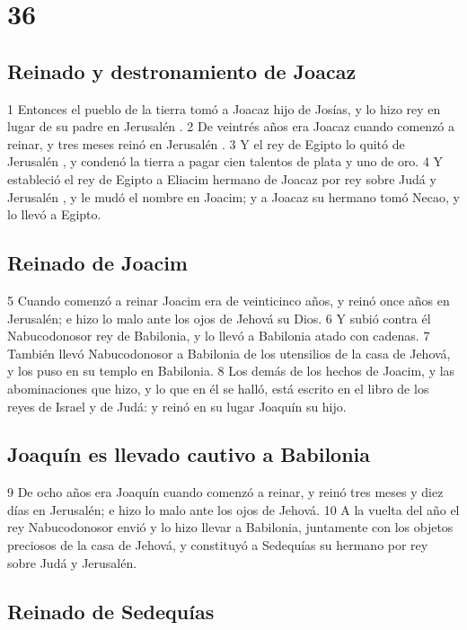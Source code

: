 \chapter{36}

\section*{Reinado y destronamiento de Joacaz}

1 Entonces el pueblo de la tierra tomó a Joacaz hijo de Josías, y lo hizo rey en lugar de su padre en Jerusalén .
2 De veintrés años era Joacaz cuando comenzó a reinar,  y tres meses reinó en Jerusalén .
3 Y el rey de Egipto lo quitó de Jerusalén , y condenó la tierra a pagar cien talentos de plata   y uno de oro.
4 Y estableció el rey de Egipto a Eliacim hermano de Joacaz por rey sobre Judá y Jerusalén , y le mudó el nombre en Joacim; y a Joacaz su hermano tomó Necao, y lo llevó a Egipto. 

\section*{Reinado de Joacim}

5 Cuando comenzó a reinar Joacim era de veinticinco años, y reinó once años en Jerusalén; e hizo lo malo ante los ojos de Jehová su Dios.
6 Y subió contra él Nabucodonosor rey de Babilonia, y lo llevó a Babilonia atado con cadenas.
7 También llevó Nabucodonosor a Babilonia de los utensilios de la casa de Jehová, y los puso en su templo en Babilonia.
8 Los demás de los hechos de Joacim, y las abominaciones que hizo, y lo que en él se halló, está escrito en el libro de los reyes de Israel y de Judá: y reinó en su lugar Joaquín su hijo.

\section*{Joaquín es llevado cautivo a Babilonia}

9 De ocho años era Joaquín cuando comenzó a reinar, y reinó tres meses y diez días en Jerusalén; e hizo lo malo ante los ojos de Jehová.
10 A la vuelta del año el rey Nabucodonosor envió y lo hizo llevar a Babilonia, juntamente con los objetos preciosos de la casa de Jehová, y constituyó a Sedequías su hermano por rey sobre Judá y Jerusalén. 

\section*{Reinado de Sedequías}

